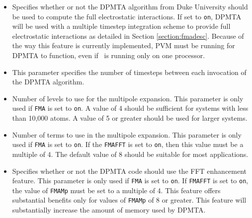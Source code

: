 \begin{itemize}

\item
{}
{Specifies whether or not 
the DPMTA algorithm from Duke University should be used 
to compute the full electrostatic interactions.  If set to 
\verb!on!, DPMTA will be used with a multiple timestep integration scheme 
to provide full electrostatic interactions as detailed in Section 
\ref{section:fmadesc}.  Because of the way this feature is currently 
implemented, PVM must be running for DPMTA to function, even if \NAMD\ 
is running only on one processor.}

\item
{}
{This parameter specifies the number of timesteps between each invocation of the DPMTA algorithm.}

\item
{}
{Number of levels to use for the multipole expansion.  This parameter
is only used if \verb!FMA! is set to \verb!on!.  
A value of 4 should be sufficient for systems with less than 10,000 atoms.  
A value of 5 or greater should be used for larger systems. }

\item
{}
{Number of terms to use in the multipole expansion.  
This parameter is only used if \verb!FMA! is set to \verb!on!.  
If the \verb!FMAFFT! is set to \verb!on!, then this value must 
be a multiple of 4.  The default value of 8 should be suitable
for most applications.}

\item
{}
{Specifies whether or not the DPMTA code should use the FFT enhancement 
feature.  This parameter is only used if \verb!FMA! is set to \verb!on!.  
If \verb!FMAFFT! is set to \verb!on!, the value of \verb!FMAMp! must be 
set to a multiple of 4.  
This feature offers substantial benefits only for values 
of \verb!FMAMp! of 8 or greater.  This feature will substantially 
increase the amount of memory used by DPMTA.}



\end{itemize}
